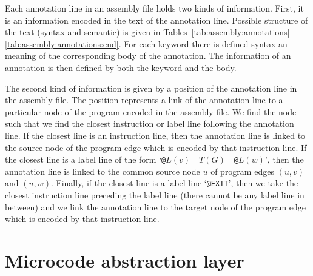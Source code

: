 \documentclass[10pt,twocolumn]{article}
\begin{document}
Each annotation line in an assembly file holds two kinds of information. First,
it is an information encoded in the text of the annotation line. Possible
structure of the text (syntax and semantic) is given in
Tables~\ref{tab:assembly:annotations}--\ref{tab:assembly:annotations:end}. For
each keyword there is defined syntax an meaning of the corresponding body of the
annotation. The information of an annotation is then defined by both the keyword
and the body.

The second kind of information is given by a position of the annotation line in
the assembly file. The position represents a link of the annotation line to a
particular node of the program encoded in the assembly file. We find the node
such that we find the closest instruction or label line following the annotation
line. If the closest line is an instruction line, then the annotation line is
linked to the source node of the program edge which is encoded by that
instruction line. If the closest line is a label line of the form `\texttt{@}$
L(v) $~~$ T(G) $~~\texttt{@}$ L(w) $', then the annotation line is linked to the
common source node $ u $ of program edges $ (u,v) $ and $ (u,w) $. Finally, if
the closest line is a label line `\texttt{@EXIT}', then we take the closest
instruction line preceding the label line (there cannot be any label line in
between) and we link the annotation line to the target node of the program edge
which is encoded by that instruction line.



\section{Microcode abstraction layer}
\label{sec:MAL}

\end{document}
